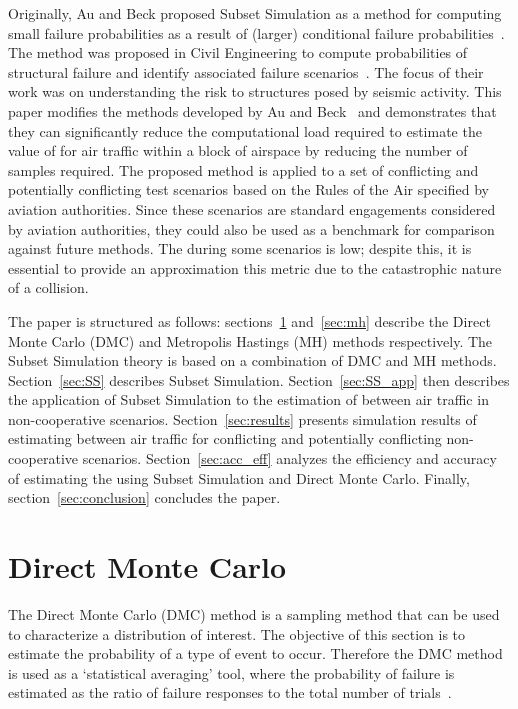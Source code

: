 \documentclass[journal]{IEEEtran}
\begin{document}
Originally, Au and Beck proposed Subset Simulation as a method for computing small failure probabilities as a result of (larger) conditional failure probabilities~\cite{au2001estimation}. The method was proposed in Civil Engineering to compute probabilities of structural failure and identify associated failure scenarios~\cite{au2003subset}. The focus of their work was on understanding the risk to structures posed by seismic activity. This paper modifies the methods developed by Au and Beck~\cite{IVAN} and demonstrates that they can significantly reduce the computational load required to estimate the value of  for air traffic within a block of airspace by reducing the number of samples required. The proposed method is applied to a set of conflicting and potentially conflicting test scenarios based on the Rules of the Air specified by aviation authorities. Since these scenarios are standard engagements considered by aviation authorities, they could also be used as a benchmark for comparison against future methods. The  during some scenarios is low; despite this, it is essential to provide an approximation this metric due to the catastrophic nature of a collision.

The paper is structured as follows: sections~\ref{sec:DMC} and~\ref{sec:mh} describe the Direct Monte Carlo (DMC) and Metropolis Hastings (MH) methods respectively. The Subset Simulation theory is based on a combination of DMC and MH methods. Section~\ref{sec:SS} describes Subset Simulation. Section~\ref{sec:SS_app} then describes the application of Subset Simulation to the estimation of  between air traffic in non-cooperative scenarios. Section~\ref{sec:results} presents simulation results of estimating  between air traffic for conflicting and potentially conflicting non-cooperative scenarios. Section~\ref{sec:acc_eff} analyzes the efficiency and accuracy of estimating the  using Subset Simulation and Direct Monte Carlo. Finally, section~\ref{sec:conclusion} concludes the paper.

\section{Direct Monte Carlo}
\label{sec:DMC}

The Direct Monte Carlo (DMC) method is a sampling method that can be used to characterize a distribution of interest. The objective of this section is to estimate the probability of a type of event to occur. Therefore the DMC method is used as a `statistical averaging' tool, where the probability of failure  is estimated as the ratio of failure responses to the total number of trials~\cite{IVAN}.
\end{document}
